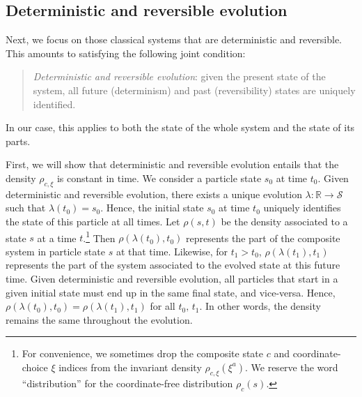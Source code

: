 \documentclass[12pt, twoside]{article}
\newcommand\bs{\begin{singlespace}}
\newcommand\es{\end{singlespace}}
\begin{document}


\subsection{Deterministic and reversible evolution}
\label{deterministic}

Next, we focus on those classical systems that are deterministic and reversible. This amounts to satisfying the following joint condition:

\begin{quotation}
\bs
\noindent
\textit{Deterministic and reversible evolution}: given the present state of the system, all future (determinism) and past (reversibility) states are uniquely identified. \es
\end{quotation}

\noindent In our case, this applies to both the state of the whole system and the state of its parts. 

First, we will show that deterministic and reversible evolution entails that the density $\rho_{c, \xi}$ is constant in time. We consider a particle state $s_0$ at time $t_0$. Given deterministic and reversible evolution, there exists a unique evolution $\lambda: \mathbb{R} \to \mathcal{S}$ such that $\lambda(t_0) = s_0$. Hence, the initial state $s_0$ at time $t_0$ uniquely identifies the state of this particle at all times. Let $\rho(s, t)$ be the density associated to a state $s$ at a time $t$.\footnote{For convenience, we sometimes drop the composite state $c$ and coordinate-choice $\xi$ indices from the invariant density $\rho_{c, \xi} (\xi^a)$. We reserve the word ``distribution'' for the coordinate-free distribution $\rho_c (s)$. } Then  $\rho(\lambda(t_0), t_0)$ represents the part of the composite system in particle state $s$ at that time. Likewise, for $t_1 > t_0$,  $\rho(\lambda(t_1), t_1)$ represents the part of the system associated to the evolved state at this future time. Given deterministic and reversible evolution, all particles that start in a given initial state must end up in the same final state, and vice-versa. Hence, $\rho(\lambda(t_0), t_0) = \rho(\lambda(t_1), t_1)$ for all $t_0,\, t_1$. In other words, the density remains the same throughout the evolution.
\end{document}
